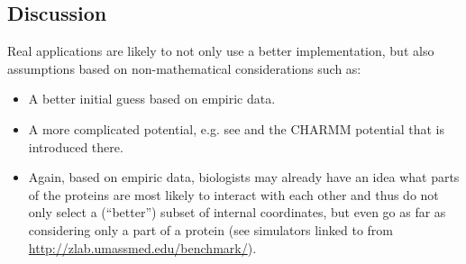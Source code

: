 \documentclass[12pt]{article}
\theoremstyle{definition}\newtheorem*{definition}{Definition}
\theoremstyle{definition}\newtheorem*{remark}{Remark}
\begin{document}
\subsection{Discussion}
Real applications are likely to not only use a better implementation, but also assumptions based on non-mathematical considerations such as:
\begin{itemize}
	\item A better initial guess based on empiric data.
	\item A more complicated potential, e.g. see \cite{Neumaier97} and the CHARMM potential that is introduced there.
	\item Again, based on empiric data, biologists may already have an idea what parts of the proteins are most likely to interact with each other and thus do not only select a (``better'') subset of internal coordinates, but even go as far as considering only a part of a protein (see simulators linked to from \url{http://zlab.umassmed.edu/benchmark/}).
\end{itemize}
\newpage


\end{document}
